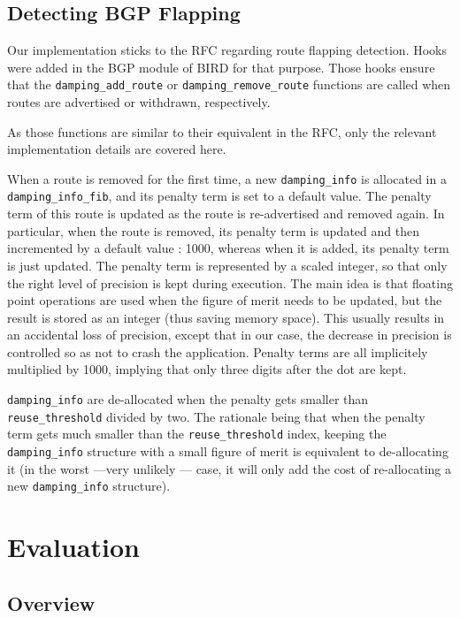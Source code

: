 \documentclass[a4paper,english]{IEEEtran}
\begin{document}
\subsection{Detecting BGP Flapping}

Our implementation sticks to the RFC regarding route flapping detection.
Hooks were added in the BGP module of BIRD for that purpose.
Those hooks ensure that the {\tt\small damping\_add\_route} or {\tt\small damping\_remove\_route} functions are 
called when routes are advertised or withdrawn, respectively.

As those functions are similar to their equivalent in the RFC, only the relevant implementation details are covered here.

When a route is removed for the first time, a new {\tt\small damping\_info} is allocated in a {\tt\small damping\_info\_fib}, and its penalty term is set to a default value.
The penalty term of this route is updated as the route is re-advertised and removed again.
In particular, when the route is removed, its penalty term is updated and then incremented by a default value : 1000, whereas when it is added, its penalty term is just updated.
The penalty term is represented by a scaled integer, so that only the right level of precision is kept during execution.
The main idea is that floating point operations are used when the figure of merit needs to be updated, but the result is stored as an integer (thus saving memory space).
This usually results in an accidental loss of precision, except that in our case, the decrease in precision is controlled so as not to crash the application.
Penalty terms are all implicitely multiplied by 1000, implying that only three digits after the dot are kept.

{\tt\small damping\_info} are de-allocated when the penalty gets smaller than {\tt\small reuse\_threshold} divided by two.
The rationale being that when the penalty term gets much smaller than the {\tt\small reuse\_threshold} index, keeping the {\tt\small damping\_info} structure with a small figure of merit is equivalent to de-allocating it (in the worst ---very unlikely --- case, it will only add the cost of re-allocating a new {\tt\small damping\_info} structure).

\section{Evaluation}

\subsection{Overview}
\end{document}
